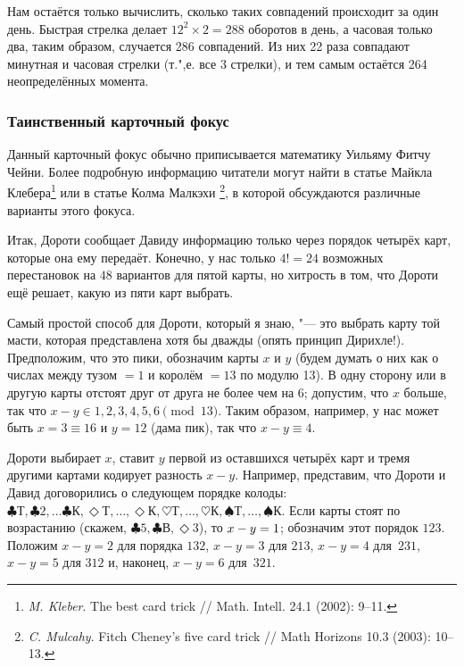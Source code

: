 \documentclass[twoside]{book}
\begin{document}
Нам остаётся только вычислить, сколько таких совпадений происходит за один день.
Быстрая стрелка делает $12^2\times 2 = 288$ оборотов в день, а часовая только два, таким образом, случается 286 совпадений.
Из них 22 раза совпадают минутная и часовая стрелки (т.",е. все $3$ стрелки), и тем самым остаётся 264 неопределённых момента. 
\heart

\subsubsection*{Таинственный карточный фокус}%

Данный карточный фокус обычно приписывается математику Уильяму Фитчу Чейни. %
Более подробную информацию читатели могут найти в статье Майкла Клебера\footnote{\emph{M. Kleber}. The best card trick /\!/ {Math. Intell.} 24.1 (2002): 9--11.}
или в статье Колма Малкэхи%
\footnote{\emph{C. Mulcahy}. Fitch Cheney's five card trick /\!/ {Math Horizons} 10.3 (2003): 10--13.}, в которой обсуждаются различные варианты этого фокуса.

\medskip

Итак, Дороти сообщает Давиду информацию только через порядок четырёх карт, которые она ему передаёт.
Конечно, у нас только $4!=24$ возможных перестановок на $48$ вариантов для пятой карты, но хитрость в том, что Дороти ещё решает, какую из пяти карт выбрать.

Самый простой способ для Дороти, который я знаю, "--- это выбрать карту той масти, которая представлена хотя бы дважды (опять принцип Дирихле!).
Предположим, что это пики, обозначим карты $x$ и $y$ (будем думать о них как о числах между тузом $=1$ и королём $=13$ по модулю 13).
В одну сторону или в другую карты отстоят друг от друга не более чем на 6;
допустим, что $x$ больше, так что $x-y\in {1,2,3,4,5,6} \pmod{13}$.
Таким образом, например, у нас может быть $x =3\equiv 16$ и $y = 12$ (дама пик), так что $x-y\equiv4$.

Дороти выбирает $x$, ставит $y$ первой из оставшихся четырёх карт и тремя другими картами кодирует разность $x-y$.
Например, представим, что Дороти и Давид договорились о следующем порядке колоды: 
$\clubsuit\text{Т},
\clubsuit 2,
\dots
\clubsuit\text{К},
\Diamond\text{Т},
\dots,
\Diamond\text{К},
\heartsuit\text{Т},
\dots,
\heartsuit\text{К},
\spadesuit \text{Т},
\dots,
\spadesuit \text{К}$.
Если карты стоят по возрастанию (скажем, 
$\clubsuit 5,
\clubsuit \text{В},
\Diamond 3$), то $x-y\z=1$; обозначим этот порядок $123$.
Положим $x-y=2$ для порядка $132$,
$x-y=3$ для $213$, $x-y=4$ для~$231$, $x-y=5$ для $312$ и, наконец, $x-y=6$ для~$321$.
\end{document}
